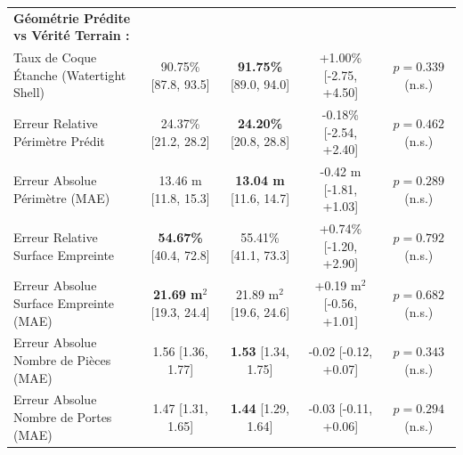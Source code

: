 \documentclass[11pt,a4paper]{report}
\begin{document}
\begin{table}[H]
\begin{tabular}{lcccc}
\midrule
\textbf{Géométrie Prédite vs Vérité Terrain :} & & & & \\
Taux de Coque Étanche (Watertight Shell) & 90.75\% [87.8, 93.5] & \textbf{91.75\%} [89.0, 94.0] & +1.00\% [-2.75, +4.50] & $p = 0.339$ (n.s.) \\
Erreur Relative Périmètre Prédit & 24.37\% [21.2, 28.2] & \textbf{24.20\%} [20.8, 28.8] & -0.18\% [-2.54, +2.40] & $p = 0.462$ (n.s.) \\
Erreur Absolue Périmètre (MAE) & 13.46 m [11.8, 15.3] & \textbf{13.04 m} [11.6, 14.7] & -0.42 m [-1.81, +1.03] & $p = 0.289$ (n.s.) \\
Erreur Relative Surface Empreinte & \textbf{54.67\%} [40.4, 72.8] & 55.41\% [41.1, 73.3] & +0.74\% [-1.20, +2.90] & $p = 0.792$ (n.s.) \\
Erreur Absolue Surface Empreinte (MAE) & \textbf{21.69 m$^2$} [19.3, 24.4] & 21.89 m$^2$ [19.6, 24.6] & +0.19 m$^2$ [-0.56, +1.01] & $p = 0.682$ (n.s.) \\
Erreur Absolue Nombre de Pièces (MAE) & 1.56 [1.36, 1.77] & \textbf{1.53} [1.34, 1.75] & -0.02 [-0.12, +0.07] & $p = 0.343$ (n.s.) \\
Erreur Absolue Nombre de Portes (MAE) & 1.47 [1.31, 1.65] & \textbf{1.44} [1.29, 1.64] & -0.03 [-0.11, +0.06] & $p = 0.294$ (n.s.) \\
\bottomrule
\end{tabular}
\end{table}
\end{document}
